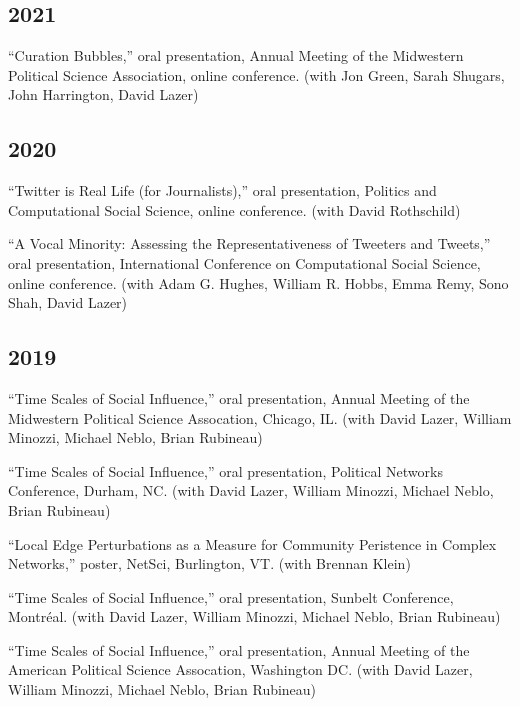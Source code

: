 \documentclass[11pt, letter]{article}
\begin{document}
\subsection{2021}
\begin{hangparas}{.25in}{1}
  ``Curation Bubbles,'' oral presentation, Annual Meeting of the Midwestern
  Political Science Association, online conference. (with Jon Green, Sarah
  Shugars, John Harrington, David Lazer)
\end{hangparas}

\subsection{2020}
\begin{hangparas}{.25in}{1}
  ``Twitter is Real Life (for Journalists),'' oral presentation, Politics and
  Computational Social Science, online conference. (with David
  Rothschild) \vspace{2mm}

``A Vocal Minority: Assessing the Representativeness of Tweeters and Tweets,''
oral presentation, International Conference on Computational Social Science,
online conference. (with Adam G. Hughes, William R. Hobbs, Emma Remy, Sono
Shah, David Lazer)
\end{hangparas}

\subsection{2019}
\begin{hangparas}{.25in}{1}
``Time Scales of Social Influence,'' oral presentation, Annual Meeting of the
Midwestern Political Science Assocation, Chicago, IL. (with David Lazer,
William Minozzi, Michael Neblo, Brian Rubineau) \vspace{2mm}

``Time Scales of Social Influence,'' oral presentation, Political Networks
Conference, Durham, NC. (with David Lazer, William Minozzi, Michael Neblo, Brian
Rubineau) \vspace{2mm}

``Local Edge Perturbations as a Measure for Community Peristence in Complex
Networks,'' poster, NetSci, Burlington, VT. (with Brennan Klein) \vspace{2mm}

``Time Scales of Social Influence,'' oral presentation, Sunbelt Conference,
Montréal. (with David Lazer, William Minozzi, Michael Neblo, Brian
Rubineau) \vspace{2mm}

``Time Scales of Social Influence,'' oral presentation, Annual Meeting of the
American Political Science Assocation, Washington DC. (with David Lazer, William
Minozzi, Michael Neblo, Brian Rubineau) \vspace{2mm}
\end{hangparas}
\end{document}
